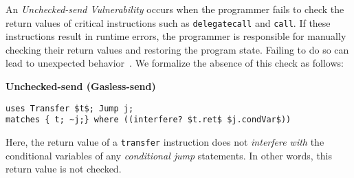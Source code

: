 
An \emph{Unchecked-send Vulnerability} occurs when the programmer fails to check 
the return values of critical instructions such as \texttt{delegatecall} and \texttt{call}. If these 
instructions result in runtime errors, the programmer is responsible for manually 
checking their return values and restoring the program state. Failing to do so can lead to unexpected
behavior~\cite{gasless}. We formalize the absence of this check as follows: 
\begin{vul}{{\bf Unchecked-send (Gasless-send)}}
\begin{lstlisting}[numbers=none,morekeywords={uses,matches,where,interfere}]
uses Transfer $t$; Jump j;
matches { t; ~j;} where ((interfere? $t.ret$ $j.condVar$))
\end{lstlisting}

\end{vul}
\noindent Here, the return value of a \texttt{transfer} instruction does not 
\emph{interfere with} the conditional variables of any \emph{conditional jump} statements. 
In other words, this return value is not checked.

